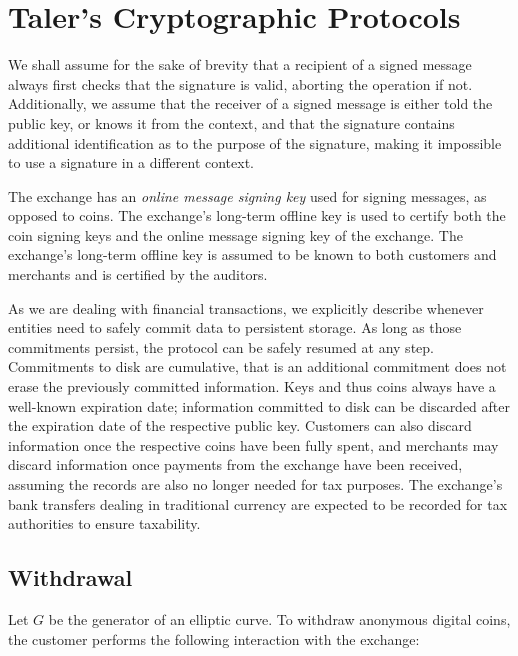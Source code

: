 \documentclass{llncs}
\begin{document}
\section{Taler's Cryptographic Protocols}


We shall assume for the sake of brevity that a recipient of a signed
message always first checks that the signature is valid, aborting the
operation if not.  Additionally, we assume that the receiver of a
signed message is either told the public key, or knows it from the
context, and that the signature contains additional identification as
to the purpose of the signature, making it impossible to use a signature
in a different context.

The exchange has an {\em online message signing key} used for signing
messages, as opposed to coins.  The exchange's long-term offline key is used
to certify both the coin signing keys and the online message signing key
of the exchange.  The exchange's long-term offline key is assumed to be known to
both customers and merchants and is certified by the auditors.

As we are dealing with financial transactions, we explicitly describe
whenever entities need to safely commit data to persistent storage.
As long as those commitments persist, the protocol can be safely
resumed at any step.  Commitments to disk are cumulative, that is an
additional commitment does not erase the previously committed
information.  Keys and thus coins always have a well-known expiration
date; information committed to disk can be discarded after the
expiration date of the respective public key.  Customers can also
discard information once the respective coins have been fully spent,
and merchants may discard information once payments from the exchange have
been received, assuming the records are also no longer needed for tax
purposes.  The exchange's bank transfers dealing in traditional currency
are expected to be recorded for tax authorities to ensure taxability.

\subsection{Withdrawal}

Let $G$ be the generator of an elliptic curve.  To withdraw anonymous
digital coins, the customer performs the following interaction with
the exchange:
\end{document}

